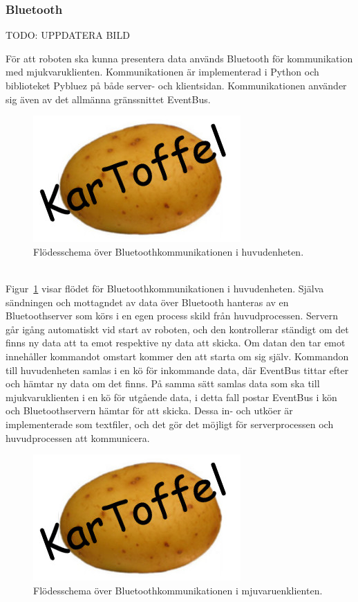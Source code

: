 \documentclass{article}
\begin{document}
\subsubsection{Bluetooth}
TODO: UPPDATERA BILD

För att roboten ska kunna presentera data används Bluetooth för kommunikation med mjukvaruklienten. Kommunikationen är implementerad i Python och biblioteket Pybluez på både server- och klientsidan. Kommunikationen använder sig även av det allmänna gränssnittet EventBus. 

\begin{figure}[H]
\centering
\includegraphics[scale=0.45]{Logo}
\caption{Flödesschema över Bluetoothkommunikationen i huvudenheten.}
\label{fig:Kommunikation_huvudenhet_v2}
\end{figure}
\ \\

Figur~\ref{fig:Kommunikation_huvudenhet_v2} visar flödet för Bluetoothkommunikationen i huvudenheten. Själva sändningen och mottagndet av data över Bluetooth hanteras av en Bluetoothserver som körs i en egen process skild från huvudprocessen. Servern går igång automatiskt vid start av roboten, och den kontrollerar ständigt om det finns ny data att ta emot respektive ny data att skicka. Om datan den tar emot innehåller kommandot omstart kommer den att starta om sig själv. Kommandon till huvudenheten samlas i en kö för inkommande data, där EventBus tittar efter och hämtar ny data om det finns. På samma sätt samlas data som ska till mjukvaruklienten i en kö för utgående data, i detta fall postar EventBus i kön och Bluetoothservern hämtar för att skicka. Dessa in- och utköer är implementerade som textfiler, och det gör det möjligt för serverprocessen och huvudprocessen att kommunicera.

\begin{figure}[H]
\centering
\includegraphics[scale=0.45]{Logo}
\caption{Flödesschema över Bluetoothkommunikationen i mjuvaruenklienten.}
\label{fig:Kommunikation_mjukvaruklient_v2}
\end{figure}
\end{document}
